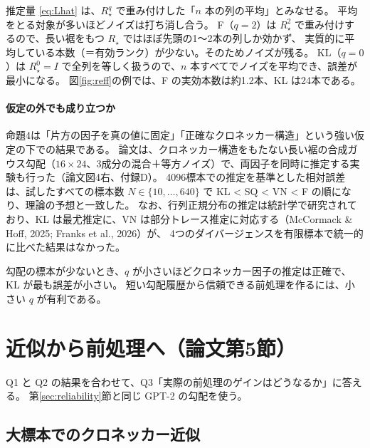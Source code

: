 \documentclass[a4paper,11pt]{ltjsarticle}
\theoremstyle{definition}
\theoremstyle{plain}
\begin{document}
\begin{intuitionbox}[なぜ F は推定誤差が大きいのか]
推定量 \eqref{eq:Lhat} は、$R_\star^{q}$ で重み付けした「$n$ 本の列の平均」とみなせる。
平均をとる対象が多いほどノイズは打ち消し合う。
F（$q=2$）は $R_\star^2$ で重み付けするので、長い裾をもつ $R_\star$ ではほぼ先頭の1〜2本の列しか効かず、
実質的に平均している本数（＝有効ランク）が少ない。そのためノイズが残る。
KL（$q=0$）は $R_\star^0 = I$ で全列を等しく扱うので、$n$ 本すべてでノイズを平均でき、誤差が最小になる。
図\ref{fig:reff}の例では、F の実効本数は約1.2本、KL は24本である。
\end{intuitionbox}

\paragraph{仮定の外でも成り立つか}
命題4は「片方の因子を真の値に固定」「正確なクロネッカー構造」という強い仮定の下での結果である。
論文は、クロネッカー構造をもたない長い裾の合成ガウス勾配（$16\times24$、3成分の混合＋等方ノイズ）で、両因子を同時に推定する実験も行った（論文図4右、付録D）。
4096標本での推定を基準とした相対誤差は、試したすべての標本数 $N\in\{10,\dots,640\}$ で
KL < SQ < VN < F の順になり、理論の予想と一致した。
なお、行列正規分布の推定は統計学で研究されており、KL は最尤推定に、VN は部分トレース推定に対応する（McCormack \& Hoff, 2025; Franks et al., 2026）が、
4つのダイバージェンスを有限標本で統一的に比べた結果はなかった。

\begin{pointbox}
勾配の標本が少ないとき、$q$ が小さいほどクロネッカー因子の推定は正確で、KL が最も誤差が小さい。
短い勾配履歴から信頼できる前処理を作るには、小さい $q$ が有利である。
\end{pointbox}

\section{近似から前処理へ（論文第5節）}\label{sec:precond}

Q1 と Q2 の結果を合わせて、Q3「実際の前処理のゲインはどうなるか」に答える。
第\ref{sec:reliability}節と同じ GPT-2 の勾配を使う。

\subsection{大標本でのクロネッカー近似}
\end{document}
